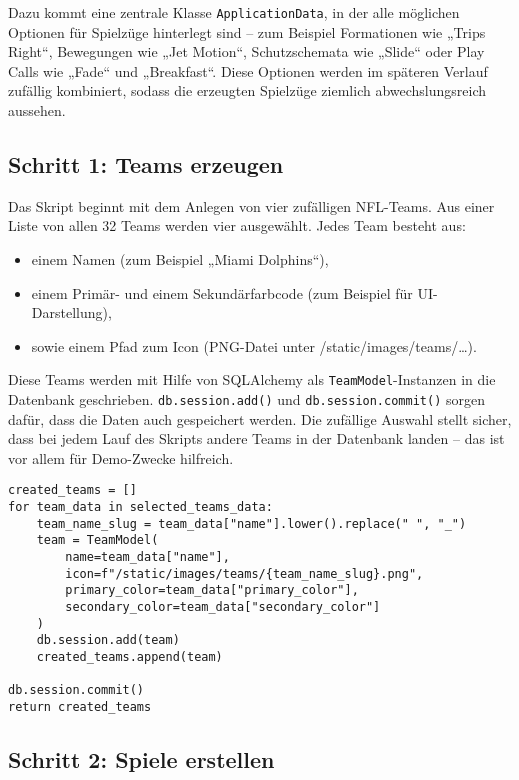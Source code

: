 Dazu kommt eine zentrale Klasse \texttt{ApplicationData}, in der alle möglichen Optionen für Spielzüge hinterlegt sind – zum Beispiel Formationen wie „Trips Right“, Bewegungen wie „Jet Motion“, Schutzschemata wie „Slide“ oder Play Calls wie „Fade“ und „Breakfast“. Diese Optionen werden im späteren Verlauf zufällig kombiniert, sodass die erzeugten Spielzüge ziemlich abwechslungsreich aussehen.

\subsection{Schritt 1: Teams erzeugen}

Das Skript beginnt mit dem Anlegen von vier zufälligen NFL-Teams. Aus einer Liste von allen 32 Teams werden vier ausgewählt. Jedes Team besteht aus:
\begin{itemize}
  \item einem Namen (zum Beispiel „Miami Dolphins“),
  \item einem Primär- und einem Sekundärfarbcode (zum Beispiel für UI-Darstellung),
  \item sowie einem Pfad zum Icon (PNG-Datei unter /static/images/teams/\dots).
\end{itemize}

Diese Teams werden mit Hilfe von SQLAlchemy als \texttt{TeamModel}-Instanzen in die Datenbank geschrieben. \texttt{db.session.add()} und \texttt{db.session.commit()} sorgen dafür, dass die Daten auch gespeichert werden. Die zufällige Auswahl stellt sicher, dass bei jedem Lauf des Skripts andere Teams in der Datenbank landen – das ist vor allem für Demo-Zwecke hilfreich.

\begin{verbatim}
created_teams = []
for team_data in selected_teams_data:
    team_name_slug = team_data["name"].lower().replace(" ", "_")
    team = TeamModel(
        name=team_data["name"],
        icon=f"/static/images/teams/{team_name_slug}.png",
        primary_color=team_data["primary_color"],
        secondary_color=team_data["secondary_color"]
    )
    db.session.add(team)
    created_teams.append(team)

db.session.commit()
return created_teams
\end{verbatim}

\subsection{Schritt 2: Spiele erstellen}

